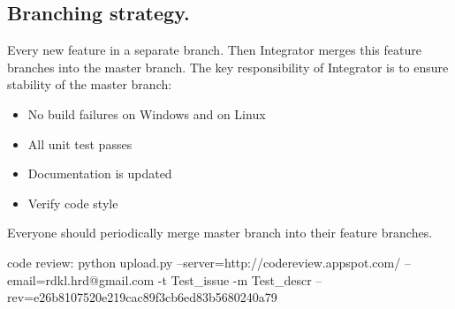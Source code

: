 \documentclass[11pt,a4paper,twoside]{report}
\begin{document}
\subsection{Branching strategy.}
Every new feature in a separate branch.
Then Integrator merges this feature branches into the master branch.
The key responsibility of Integrator is to ensure stability of the master branch:
\begin{itemize}
    \item No build failures on Windows and on Linux
    \item All unit test passes
    \item Documentation is updated
    \item Verify code style
\end{itemize}
Everyone should periodically merge master branch into their feature branches.

code review:
python upload.py --server=http://codereview.appspot.com/ --email=rdkl.hrd@gmail.com  -t Test_issue -m Test_descr --rev=e26b8107520e219cac89f3cb6ed83b5680240a79
\end{document}

